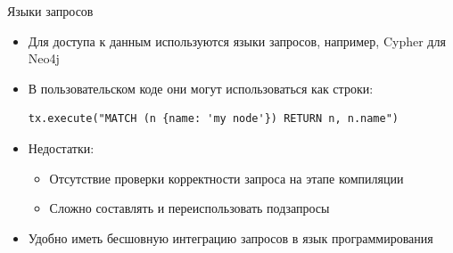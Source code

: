 \documentclass[aspectratio=169]{beamer}
\begin{document}
\begin{frame}[fragile]{Языки запросов}
  \begin{itemize}
    \item Для доступа к данным используются языки запросов, например, Cypher для Neo4j
    \item В пользовательском коде они могут использоваться как строки:
          \begin{verbatim}
tx.execute("MATCH (n {name: 'my node'}) RETURN n, n.name")
\end{verbatim}
    \item Недостатки:
          \begin{itemize}
            \item Отсутствие проверки корректности запроса на этапе компиляции
            \item Сложно составлять и переиспользовать подзапросы
          \end{itemize}
    \item Удобно иметь бесшовную интеграцию запросов в язык программирования
  \end{itemize}

\end{frame}
\end{document}
